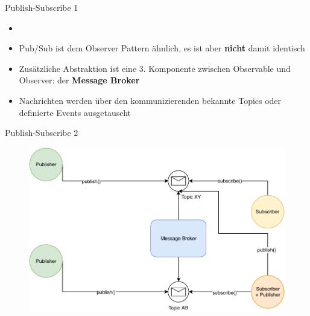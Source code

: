 \begin{frame}{Publish-Subscribe 1} %
      \begin{itemize}
        \setlength{\itemindent}{1.5in}
        \item [\textbf{Publish/Subscribe Pattern}]
    \end{itemize}

    \begin{itemize}
        \item Pub/Sub ist dem Observer Pattern ähnlich, es ist aber \textbf{nicht} damit identisch  
        \item Zusätzliche Abstraktion ist eine 3. Komponente zwischen Observable und Observer: der  \textbf{Message Broker}
        \item Nachrichten werden über den kommunizierenden bekannte Topics oder definierte Events ausgetauscht
    \end{itemize}   

\end{frame}


\begin{frame}{Publish-Subscribe 2} 
      \begin{figure}[!htb]
        \includegraphics[scale=0.67]{6-python3/img/pubsub}  
    \end{figure}

\end{frame}


